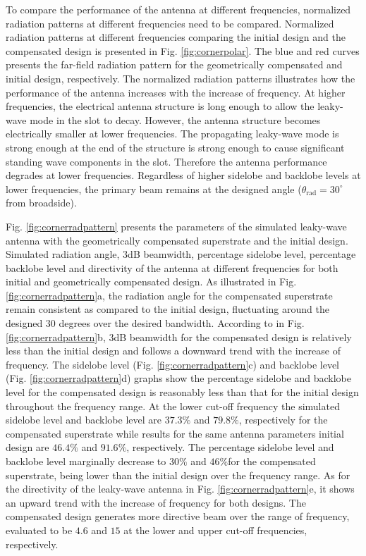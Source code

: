 %
To compare the performance of the antenna at different frequencies, normalized radiation patterns at different frequencies need to be compared. Normalized radiation patterns at different frequencies comparing the initial design and the compensated design is presented in Fig. \ref{fig:cornerpolar}. The blue and red curves presents the far-field radiation pattern for the geometrically compensated and initial design, respectively. The normalized radiation patterns illustrates how the performance of the antenna increases with the increase of frequency. At higher frequencies, the electrical antenna structure is long enough to allow the leaky-wave mode in the slot to decay. However, the antenna structure becomes electrically smaller at lower frequencies. The propagating leaky-wave mode is strong enough at the end of the structure is strong enough to cause significant standing wave components in the slot. Therefore the antenna performance degrades at lower frequencies. Regardless of higher sidelobe and backlobe levels at lower frequencies, the primary beam remains at the designed angle ($\theta_{\mathrm{rad}} = 30^\circ$ from broadside).

Fig. \ref{fig:cornerradpattern} presents the parameters of the simulated leaky-wave antenna with the geometrically compensated superstrate and the initial design. Simulated radiation angle, 3dB beamwidth, percentage sidelobe level, percentage backlobe level and directivity of the antenna at different frequencies for both initial and geometrically compensated design. As illustrated in Fig. \ref{fig:cornerradpattern}a, the radiation angle for the compensated superstrate remain consistent as compared to the initial design, fluctuating around the designed $30$ degrees over the desired bandwidth. According to in Fig. \ref{fig:cornerradpattern}b, 3dB beamwidth for the compensated design is relatively less than the initial design and follows a downward trend with the increase of frequency. The sidelobe level (Fig. \ref{fig:cornerradpattern}c) and backlobe level (Fig. \ref{fig:cornerradpattern}d) graphs show the percentage sidelobe and backlobe level for the compensated design is reasonably less than that for the initial design throughout the frequency range. At the lower cut-off frequency the simulated sidelobe level and backlobe level are $37.3\%$ and $79.8\%$, respectively for the compensated superstrate while results for the same antenna parameters initial design are $46.4\%$ and $91.6\%$, respectively. The percentage sidelobe level and  backlobe level marginally decrease to $30\%$ and $46\%$for the compensated superstrate, being lower than the initial design over the frequency range. As for the directivity of the leaky-wave antenna in Fig. \ref{fig:cornerradpattern}e, it shows an upward trend with the increase of frequency for both designs. The compensated design generates more directive beam over the range of frequency, evaluated to be $4.6$ and $15$ at the lower and upper cut-off frequencies, respectively.

